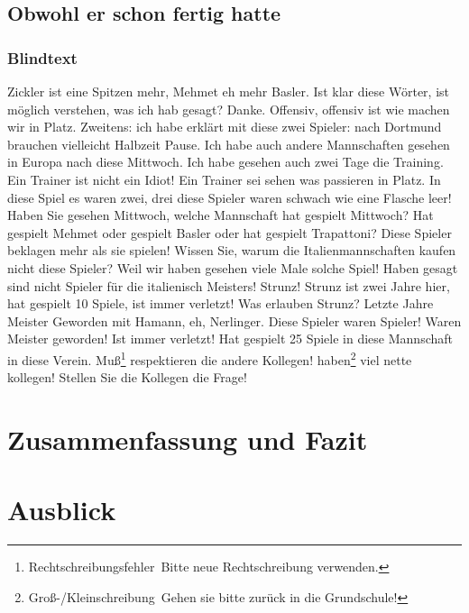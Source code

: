 \subsection{Obwohl er schon fertig hatte}
\subsubsection{Blindtext}
Zickler  ist eine Spitzen mehr, Mehmet eh mehr Basler. Ist klar diese Wörter, ist möglich verstehen, was ich hab gesagt? Danke. Offensiv, offensiv ist wie machen wir in Platz. Zweitens: ich habe erklärt mit diese zwei Spieler: nach Dortmund brauchen vielleicht Halbzeit Pause. Ich habe auch andere Mannschaften gesehen in Europa nach diese Mittwoch. Ich habe gesehen auch zwei Tage die Training. Ein Trainer ist nicht ein Idiot! Ein Trainer sei sehen was passieren in Platz. In diese Spiel es waren zwei, drei diese Spieler waren schwach wie eine Flasche leer! Haben Sie gesehen Mittwoch, welche Mannschaft hat gespielt Mittwoch? Hat gespielt Mehmet  oder gespielt Basler oder hat gespielt Trapattoni?
Diese Spieler beklagen mehr als sie spielen!  Wissen Sie, warum die Italienmannschaften kaufen nicht diese Spieler? Weil wir haben gesehen viele Male solche Spiel! Haben gesagt sind nicht Spieler für die italienisch Meisters! Strunz! Strunz ist zwei Jahre hier, hat gespielt 10 Spiele, ist immer verletzt! Was erlauben Strunz? Letzte Jahre Meister Geworden mit Hamann, eh, Nerlinger. Diese Spieler waren Spieler! Waren Meister geworden! Ist immer verletzt! Hat gespielt 25 Spiele in diese Mannschaft in diese Verein. Muß\footnote{Rechtschreibungsfehler \frqq\,Bitte neue Rechtschreibung verwenden.} respektieren die andere Kollegen! haben\footnote{Groß-/Kleinschreibung \frqq\,Gehen sie bitte zurück in die Grundschule!} viel nette kollegen! Stellen Sie die Kollegen die Frage!

\clearpage
\section{Zusammenfassung und Fazit}
\blindtext

\clearpage
\section{Ausblick}
\blindtext

\clearpage
\printbibliography[heading=subbibliography,title={Literaturverzeichnis\vspace{8pt}},nottype=online]

\clearpage
\printbibliography[heading=subbibliography,title={Quellenverzeichnis\vspace{8pt}},type=online]

\clearpage
{%
\let\oldnumberline\numberline%
\renewcommand{\numberline}{\figurename~\oldnumberline}%
\listoffigures%
}

